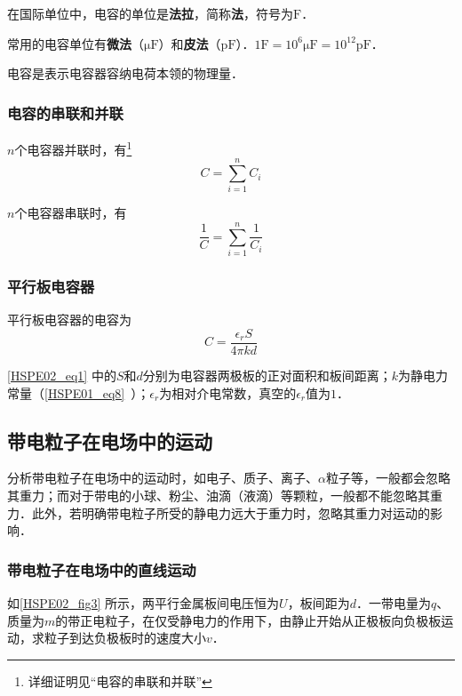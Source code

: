 在国际单位中，电容的单位是\textbf{法拉}，简称\textbf{法}，符号为$\mathrm{F}$．

常用的电容单位有\textbf{微法}（$\mathrm{\mu F}$）和\textbf{皮法}（$\mathrm{pF}$）．$1\mathrm{F}=10^6 \mathrm{\mu F}=10^{12} \mathrm{pF}$．

电容是表示电容器容纳电荷本领的物理量．

\subsubsection{电容的串联和并联}
$n$个电容器并联时，有\footnote{详细证明见“电容的串联和并联”}
\begin{equation}
C=\sum_{i=1}^{n}C_i
\end{equation}

$n$个电容器串联时，有
\begin{equation}
\frac{1}{C}=\sum_{i=1}^{n}\frac{1}{C_i}
\end{equation}

\subsubsection{平行板电容器}

平行板电容器的电容为
\begin{equation}\label{HSPE02_eq1}
C = \frac {\epsilon_r S}{4\pi kd}
\end{equation}

\autoref{HSPE02_eq1} 中的$S$和$d$分别为电容器两极板的正对面积和板间距离；$k$为静电力常量（\autoref{HSPE01_eq8}~）；$\epsilon_r$为相对介电常数，真空的$\epsilon_r$值为$1$．

\subsection{带电粒子在电场中的运动}

分析带电粒子在电场中的运动时，如电子、质子、离子、$\alpha$粒子等，一般都会忽略其重力；而对于带电的小球、粉尘、油滴（液滴）等颗粒，一般都不能忽略其重力．此外，若明确带电粒子所受的静电力远大于重力时，忽略其重力对运动的影响．

\subsubsection{带电粒子在电场中的直线运动}

如\autoref{HSPE02_fig3} 所示，两平行金属板间电压恒为$U$，板间距为$d$．一带电量为$q$、质量为$m$的带正电粒子，在仅受静电力的作用下，由静止开始从正极板向负极板运动，求粒子到达负极板时的速度大小$v$．

